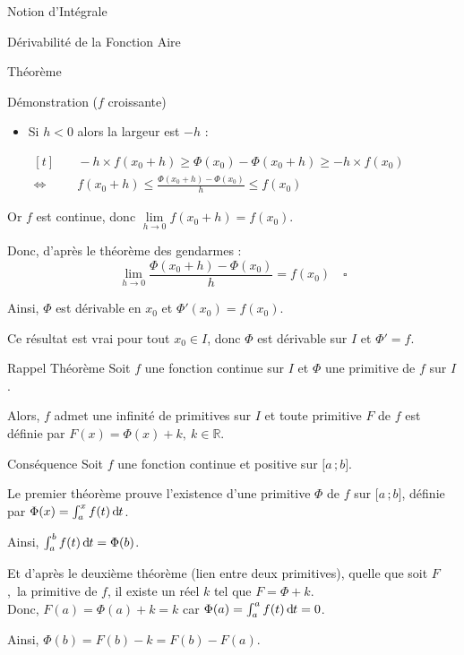 \documentclass{coursbook}
\begin{document}
\begin{Gpartie}{Notion d'Intégrale}
\begin{Spartie}{Dérivabilité de la Fonction Aire}
\begin{SSpartie}{Théorème}
\begin{SSSpartie}{Démonstration \big($f$ croissante\big)}
\begin{itemize}
                        \item Si $h<0$ alors la largeur est $-h$ :
                        
                        $\begin{aligned}[t]
                            &\quad -h\times f(x_0+h)\geq\Phi(x_0)-\Phi(x_0+h)\geq -h\times f(x_0) \\
                            \iff&\quad f(x_0+h)\leq\frac{\Phi\left(x_0+h\right)-\Phi(x_0)}{h}\leq f(x_0)
                        \end{aligned}$
                    \end{itemize}
                    Or $f$ est continue, donc $\lim\limits_{h\to0}f(x_0+h)=f(x_0)$.

                    Donc, d'après le théorème des gendarmes : \[\lim\limits_{h\to0}\frac{\Phi\left(x_0+h\right)-\Phi(x_0)}{h}=f(x_0)\quad\square\]

                    Ainsi, $\Phi$ est dérivable en $x_0$ et $\Phi'(x_0)=f(x_0)$.

                    Ce résultat est vrai pour tout $x_0\in I$, donc $\Phi$ est dérivable sur $I$ et $\Phi'=f$.
                \end{SSSpartie}
            \end{SSpartie}
            \begin{SSpartie}{Rappel Théorème} 
                Soit $f$ une fonction continue sur $I$ et $\Phi$ une primitive de $f$ sur $I$.

                Alors, $f$ admet une infinité de primitives sur $I$ et toute primitive $F$ de $f$ est définie par $F(x)=\Phi(x)+k,~k\in\mathbb{R}$.
            \end{SSpartie}
            \begin{SSpartie}{Conséquence} 
                Soit $f$ une fonction continue et positive sur $\big[a\,; b\big]$.

                Le premier théorème prouve l'existence d'une primitive $\Phi$ de $f$ sur $\big[a\,; b\big]$, définie par $\Phi(x)=\int_a^xf(t)\,\mathrm{d}\hspace*{-0.05em}t$.

                Ainsi, $\int_a^b f(t)\,\mathrm{d}\hspace*{-0.05em}t=\Phi(b)$.

                Et d'après le deuxième théorème (lien entre deux primitives), quelle que soit $F$,~la primitive de $f$, il existe un réel $k$ tel que $F=\Phi+k$. \\ Donc, $F(a)=\Phi(a)+k=k$ car $\Phi(a)=\int_a^af(t)\,\mathrm{d}\hspace*{-0.05em}t=0$.

                Ainsi, $\Phi(b)=F(b)-k=F(b)-F(a)$.


\end{SSpartie}
\end{Spartie}
\end{Gpartie}
\end{document}
